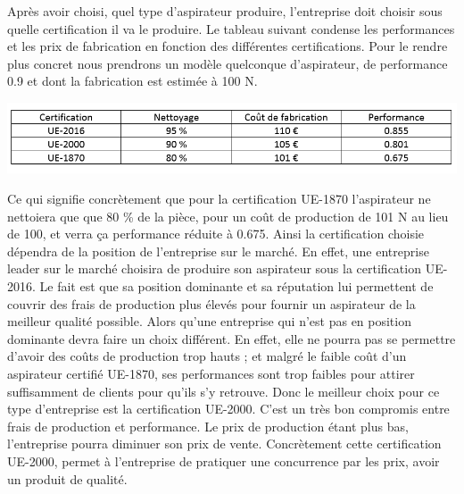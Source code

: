 \documentclass[12pt]{article}
\begin{document}
\justify
Après avoir choisi, quel type d'aspirateur produire, l'entreprise doit choisir sous quelle certification il va le produire. Le tableau suivant condense les performances et les prix de fabrication en fonction des différentes certifications. Pour le rendre plus concret nous prendrons un modèle quelconque d'aspirateur, de performance 0.9 et dont la fabrication est estimée à 100 N.
\begin{center}
	\includegraphics[scale=0.85]{Capture}
\end{center}
Ce qui signifie concrètement que pour la certification UE-1870 l'aspirateur ne nettoiera que que 80 \% de la pièce, pour un coût de production de 101 N au lieu de 100, et verra ça performance réduite à 0.675. Ainsi la certification choisie dépendra de la position de l'entreprise sur le marché.
\justify
En effet, une entreprise leader sur le marché choisira de produire son aspirateur sous la certification UE-2016. Le fait est que sa position dominante et sa réputation lui permettent de couvrir des frais de production plus élevés pour fournir un aspirateur de la meilleur qualité possible.
\justify
Alors qu'une entreprise qui n'est pas en position dominante devra faire un choix différent. En effet, elle ne pourra pas se permettre d'avoir des coûts de production trop hauts ; et malgré le faible coût d'un aspirateur certifié UE-1870, ses performances sont trop faibles pour attirer suffisamment de clients pour qu'ils s'y retrouve. Donc le meilleur choix pour ce type d'entreprise est la certification UE-2000. C'est un très bon compromis entre frais de production et performance. Le prix de production étant plus bas, l'entreprise pourra diminuer son prix de vente. Concrètement cette certification UE-2000, permet à l'entreprise de pratiquer une concurrence par les prix, avoir un produit de qualité.
\end{document}
